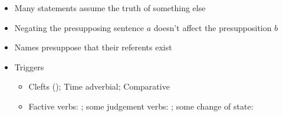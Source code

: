 \documentclass[a4paper,landscape,headrule,footrule,xetex]{foils}
\begin{document}

\begin{itemize}
\item Many statements assume the truth of something else
  \begin{exe}
    \ex   \begin{xlist}
    \ex {} %
    \ex {} %
    \end{xlist}
  \end{exe}
\item Negating the presupposing sentence $a$ doesn't affect the presupposition $b$
\item Names presuppose that their referents exist
\item Triggers 
  \begin{itemize}
  \item Clefts (); Time adverbial; Comparative
  \item Factive verbs: ; 
    some judgement verbs: ; 
    some change of state: 
    \end{itemize}
\end{itemize}






\end{document}
